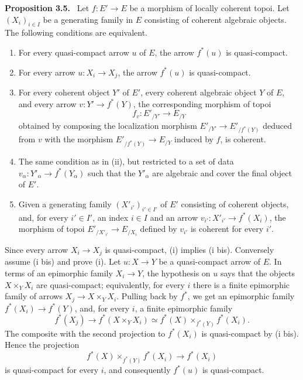 \documentclass[11pt]{article}
\newenvironment{statement}[1]{\par\medskip\noindent\textbf{#1.}\ }{\par\medskip}
\begin{document}
\begin{statement}{Proposition 3.5}
Let \(f:E'\to E\) be a morphism of locally coherent topoi. Let \((X_i)_{i\in I}\) be a generating family in \(E\) consisting of coherent algebraic objects. The following conditions are equivalent.
\begin{enumerate}[label=(\roman*)]
\item For every quasi-compact arrow \(u\) of \(E\), the arrow \(f^*(u)\) is quasi-compact.
\item[(i bis)] For every arrow \(u:X_i\to X_j\), the arrow \(f^*(u)\) is quasi-compact.
\item[(ii)] For every coherent object \(Y'\) of \(E'\), every coherent algebraic object \(Y\) of \(E\), and every arrow \(v:Y'\to f^*(Y)\), the corresponding morphism of topoi
\[
 f_v:E'_{/Y'}\to E_{/Y}
\]
obtained by composing the localization morphism \(E'_{/Y'}\to E'_{/f^*(Y)}\) deduced from \(v\) with the morphism \(E'_{/f^*(Y)}\to E_{/Y}\) induced by \(f\), is coherent.
\item[(ii bis)] The same condition as in (ii), but restricted to a set of data \(v_\alpha:Y'_\alpha\to f^*(Y_\alpha)\) such that the \(Y'_\alpha\) are algebraic and cover the final object of \(E'\).
\item[(ii ter)] Given a generating family \((X'_{i'})_{i'\in I'}\) of \(E'\) consisting of coherent objects, and, for every \(i'\in I'\), an index \(i\in I\) and an arrow \(v_{i'}:X'_{i'}\to f^*(X_i)\), the morphism of topoi \(E'_{/X'_{i'}}\to E_{/X_i}\) defined by \(v_{i'}\) is coherent for every \(i'\).
\end{enumerate}
\end{statement}

Since every arrow \(X_i\to X_j\) is quasi-compact, (i) implies (i bis). Conversely assume (i bis) and prove (i). Let \(u:X\to Y\) be a quasi-compact arrow of \(E\). In terms of an epimorphic family \(X_i\to Y\), the hypothesis on \(u\) says that the objects \(X\times_Y X_i\) are quasi-compact; equivalently, for every \(i\) there is a finite epimorphic family of arrows \(X_j\to X\times_Y X_i\). Pulling back by \(f^*\), we get an epimorphic family \(f^*(X_i)\to f^*(Y)\), and, for every \(i\), a finite epimorphic family
\[
 f^*(X_j)\to f^*(X\times_Y X_i)\simeq f^*(X)\times_{f^*(Y)}f^*(X_i).
\]
The composite with the second projection to \(f^*(X_i)\) is quasi-compact by (i bis). Hence the projection
\[
 f^*(X)\times_{f^*(Y)}f^*(X_i)\to f^*(X_i)
\]
is quasi-compact for every \(i\), and consequently \(f^*(u)\) is quasi-compact.
\end{document}
